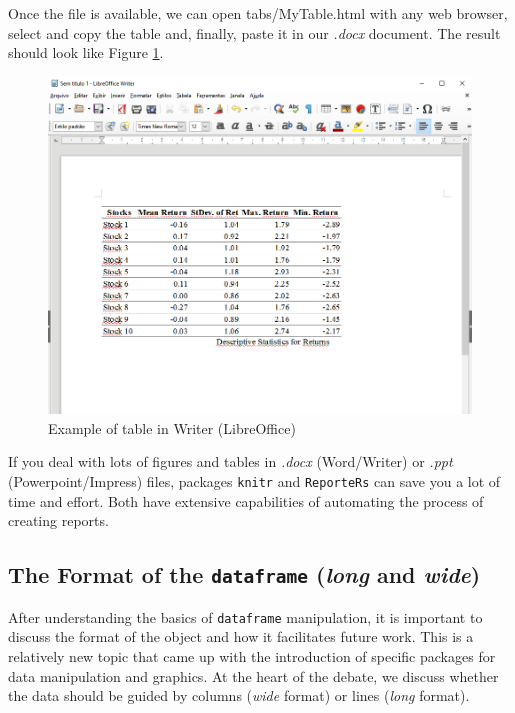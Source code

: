 \documentclass[11pt,]{book}
\begin{document}
Once the file is available, we can open tabs/MyTable.html with any web
browser, select and copy the table and, finally, paste it in our
\emph{.docx} document. The result should look like Figure
\ref{fig:Writer-TableExample}.

\begin{figure}[!htbp]

{\centering \includegraphics[width=0.75\linewidth]{figs/Writer-TableExample} 

}

\caption{Example of table in Writer (LibreOffice)}\label{fig:Writer-TableExample}
\end{figure}

If you deal with lots of figures and tables in \emph{.docx}
(Word/Writer) or \emph{.ppt} (Powerpoint/Impress) files, packages
\texttt{knitr} \citep{knitr} and \texttt{ReporteRs} \citep{reporters}
can save you a lot of time and effort. Both have extensive capabilities
of automating the process of creating reports. 

\subsection{\texorpdfstring{The Format of the \texttt{dataframe}
(\emph{long} and
\emph{wide})}{The Format of the dataframe (long and wide)}}\label{the-format-of-the-dataframe-long-and-wide}

After understanding the basics of \texttt{dataframe} manipulation, it is
important to discuss the format of the object and how it facilitates
future work. This is a relatively new topic that came up with the
introduction of specific packages for data manipulation and graphics. At
the heart of the debate, we discuss whether the data should be guided by
columns (\emph{wide} format) or lines (\emph{long} format).
 
\end{document}
